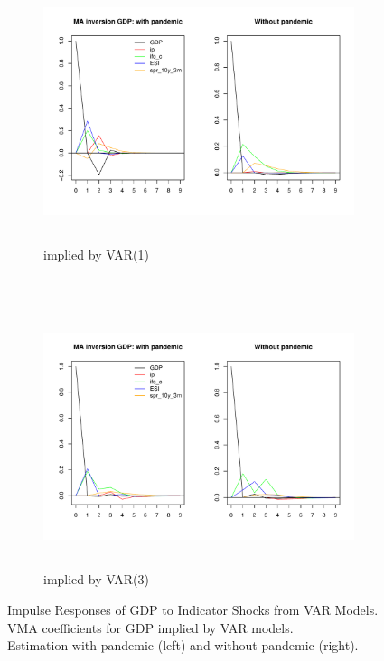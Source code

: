 \documentclass[11pt,a4paper]{article}
\begin{document}
\begin{figure}[htpb]
    \begin{subfigure}[htpb]{\textwidth}
        \begin{center}
            \includegraphics[height=3in, width=6in]{./Figures/ma_inv_BIP.pdf}
            \caption{implied by VAR(1) \label{fig:ma_inv_BIP}}
        \end{center}
    \end{subfigure}
    \\
    \begin{subfigure}[htpb]{\textwidth}
        \begin{center}
            \includegraphics[height=3in, width=6in]{./Figures/ma_inv_BIP_var3_en.pdf}
            \caption{implied by VAR(3)\label{fig:ma_inv_BIP_var3_en}}
        \end{center}
    \end{subfigure}
    \caption{Impulse Responses of GDP to Indicator Shocks from VAR Models.\\  VMA coefficients for GDP implied by VAR models.
    \\Estimation with pandemic (left) and without pandemic (right).}
\end{figure}
\end{document}
